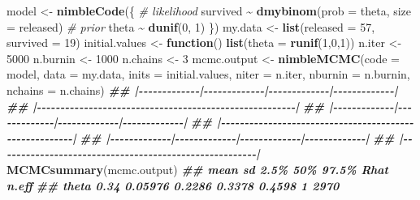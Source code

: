 \documentclass[
  12pt,
]{krantz}
\newenvironment{Shaded}{\begin{snugshade}}{\end{snugshade}}
\newcommand{\AttributeTok}[1]{\textcolor[rgb]{0.13,0.29,0.53}{#1}}
\newcommand{\CommentTok}[1]{\textcolor[rgb]{0.56,0.35,0.01}{\textit{#1}}}
\newcommand{\ControlFlowTok}[1]{\textcolor[rgb]{0.13,0.29,0.53}{\textbf{#1}}}
\newcommand{\DecValTok}[1]{\textcolor[rgb]{0.00,0.00,0.81}{#1}}
\newcommand{\DocumentationTok}[1]{\textcolor[rgb]{0.56,0.35,0.01}{\textbf{\textit{#1}}}}
\newcommand{\FunctionTok}[1]{\textcolor[rgb]{0.13,0.29,0.53}{\textbf{#1}}}
\newcommand{\NormalTok}[1]{#1}
\newcommand{\OtherTok}[1]{\textcolor[rgb]{0.56,0.35,0.01}{#1}}
\newcommand{\SpecialCharTok}[1]{\textcolor[rgb]{0.81,0.36,0.00}{\textbf{#1}}}
\begin{document}
\begin{Shaded}
\begin{Highlighting}[]
\NormalTok{model }\OtherTok{\textless{}{-}} \FunctionTok{nimbleCode}\NormalTok{(\{}
 \CommentTok{\# likelihood}
\NormalTok{ survived }\SpecialCharTok{\textasciitilde{}} \FunctionTok{dmybinom}\NormalTok{(}\AttributeTok{prob =}\NormalTok{ theta, }\AttributeTok{size =}\NormalTok{ released)}
 \CommentTok{\# prior}
\NormalTok{ theta }\SpecialCharTok{\textasciitilde{}} \FunctionTok{dunif}\NormalTok{(}\DecValTok{0}\NormalTok{, }\DecValTok{1}\NormalTok{)}
\NormalTok{\})}
\NormalTok{my.data }\OtherTok{\textless{}{-}} \FunctionTok{list}\NormalTok{(}\AttributeTok{released =} \DecValTok{57}\NormalTok{, }\AttributeTok{survived =} \DecValTok{19}\NormalTok{)}
\NormalTok{initial.values }\OtherTok{\textless{}{-}} \ControlFlowTok{function}\NormalTok{() }\FunctionTok{list}\NormalTok{(}\AttributeTok{theta =} \FunctionTok{runif}\NormalTok{(}\DecValTok{1}\NormalTok{,}\DecValTok{0}\NormalTok{,}\DecValTok{1}\NormalTok{))}
\NormalTok{n.iter }\OtherTok{\textless{}{-}} \DecValTok{5000}
\NormalTok{n.burnin }\OtherTok{\textless{}{-}} \DecValTok{1000}
\NormalTok{n.chains }\OtherTok{\textless{}{-}} \DecValTok{3}
\NormalTok{mcmc.output }\OtherTok{\textless{}{-}} \FunctionTok{nimbleMCMC}\NormalTok{(}\AttributeTok{code =}\NormalTok{ model,}
 \AttributeTok{data =}\NormalTok{ my.data,}
 \AttributeTok{inits =}\NormalTok{ initial.values,}
 \AttributeTok{niter =}\NormalTok{ n.iter,}
 \AttributeTok{nburnin =}\NormalTok{ n.burnin,}
 \AttributeTok{nchains =}\NormalTok{ n.chains)}
\DocumentationTok{\#\# |{-}{-}{-}{-}{-}{-}{-}{-}{-}{-}{-}{-}{-}|{-}{-}{-}{-}{-}{-}{-}{-}{-}{-}{-}{-}{-}|{-}{-}{-}{-}{-}{-}{-}{-}{-}{-}{-}{-}{-}|{-}{-}{-}{-}{-}{-}{-}{-}{-}{-}{-}{-}{-}|}
\DocumentationTok{\#\# |{-}{-}{-}{-}{-}{-}{-}{-}{-}{-}{-}{-}{-}{-}{-}{-}{-}{-}{-}{-}{-}{-}{-}{-}{-}{-}{-}{-}{-}{-}{-}{-}{-}{-}{-}{-}{-}{-}{-}{-}{-}{-}{-}{-}{-}{-}{-}{-}{-}{-}{-}{-}{-}{-}{-}|}
\DocumentationTok{\#\# |{-}{-}{-}{-}{-}{-}{-}{-}{-}{-}{-}{-}{-}|{-}{-}{-}{-}{-}{-}{-}{-}{-}{-}{-}{-}{-}|{-}{-}{-}{-}{-}{-}{-}{-}{-}{-}{-}{-}{-}|{-}{-}{-}{-}{-}{-}{-}{-}{-}{-}{-}{-}{-}|}
\DocumentationTok{\#\# |{-}{-}{-}{-}{-}{-}{-}{-}{-}{-}{-}{-}{-}{-}{-}{-}{-}{-}{-}{-}{-}{-}{-}{-}{-}{-}{-}{-}{-}{-}{-}{-}{-}{-}{-}{-}{-}{-}{-}{-}{-}{-}{-}{-}{-}{-}{-}{-}{-}{-}{-}{-}{-}{-}{-}|}
\DocumentationTok{\#\# |{-}{-}{-}{-}{-}{-}{-}{-}{-}{-}{-}{-}{-}|{-}{-}{-}{-}{-}{-}{-}{-}{-}{-}{-}{-}{-}|{-}{-}{-}{-}{-}{-}{-}{-}{-}{-}{-}{-}{-}|{-}{-}{-}{-}{-}{-}{-}{-}{-}{-}{-}{-}{-}|}
\DocumentationTok{\#\# |{-}{-}{-}{-}{-}{-}{-}{-}{-}{-}{-}{-}{-}{-}{-}{-}{-}{-}{-}{-}{-}{-}{-}{-}{-}{-}{-}{-}{-}{-}{-}{-}{-}{-}{-}{-}{-}{-}{-}{-}{-}{-}{-}{-}{-}{-}{-}{-}{-}{-}{-}{-}{-}{-}{-}|}
\FunctionTok{MCMCsummary}\NormalTok{(mcmc.output)}
\DocumentationTok{\#\#       mean      sd   2.5\%    50\%  97.5\% Rhat n.eff}
\DocumentationTok{\#\# theta 0.34 0.05976 0.2286 0.3378 0.4598    1  2970}
\end{Highlighting}
\end{Shaded}
\end{document}
